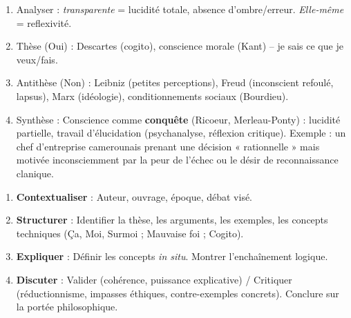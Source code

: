 \documentclass[11pt]{article}
\newcounter{popsec}
\newcounter{popsub}
\newcommand{\courssub}[1]{%
  \stepcounter{popsub}%
  \par\vspace{9pt}\noindent{\popxbold\fontsize{11.5}{13}\selectfont\color{popink}{\color{poporange}\thepopsec.\thepopsub}\hspace{6pt}#1}\par\nopagebreak\vspace{4pt}
}
\begin{document}
\begin{bilan}
\courssub{Méthodes express}
\begin{methode}
\begin{enumerate}
  \item Analyser : \textit{transparente} = lucidité totale, absence d'ombre/erreur. \textit{Elle-même} = reflexivité.
  \item Thèse (Oui) : Descartes (cogito), conscience morale (Kant) – je sais ce que je veux/fais.
  \item Antithèse (Non) : Leibniz (petites perceptions), Freud (inconscient refoulé, lapsus), Marx (idéologie), conditionnements sociaux (Bourdieu).
  \item Synthèse : Conscience comme \textbf{conquête} (Ricoeur, Merleau-Ponty) : lucidité partielle, travail d'élucidation (psychanalyse, réflexion critique). Exemple : un chef d'entreprise camerounais prenant une décision « rationnelle » mais motivée inconsciemment par la peur de l'échec ou le désir de reconnaissance clanique.
\end{enumerate}
\end{methode}

\begin{methode}
\begin{enumerate}
  \item \textbf{Contextualiser} : Auteur, ouvrage, époque, débat visé.
  \item \textbf{Structurer} : Identifier la thèse, les arguments, les exemples, les concepts techniques (Ça, Moi, Surmoi ; Mauvaise foi ; Cogito).
  \item \textbf{Expliquer} : Définir les concepts \textit{in situ}. Montrer l'enchaînement logique.
  \item \textbf{Discuter} : Valider (cohérence, puissance explicative) / Critiquer (réductionnisme, impasses éthiques, contre-exemples concrets). Conclure sur la portée philosophique.
\end{enumerate}
\end{methode}
\end{bilan}
\end{document}
